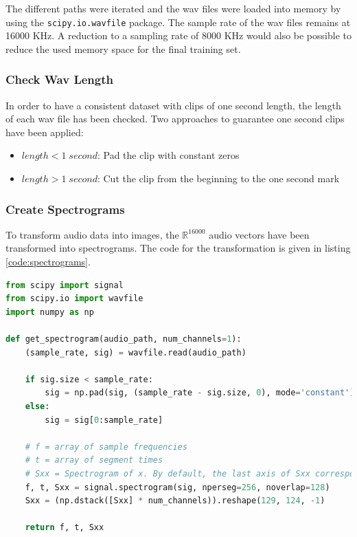 \documentclass{article}
\theoremstyle{definition}
\theoremstyle{remark}
\begin{document}
The different paths were iterated and the wav files were loaded into memory by using the \texttt{scipy.io.wavfile} package. The sample rate of the wav files remains at 16000 KHz.  A reduction to a sampling rate of 8000 KHz would also be possible to reduce the used memory space for the final training set.


\subsubsection{Check Wav Length}

In order to have a consistent dataset with clips of one second length, the length of each wav file has been checked. Two approaches to guarantee one second clips have been applied:

\begin{itemize}
	\item $length < 1 \; second$: Pad the clip with constant zeros
	\item $length > 1 \; second$: Cut the clip from the beginning to the one second mark
\end{itemize}
 

\subsubsection{Create Spectrograms}

To transform audio data into images, the $\mathbb{R}^{16000}$ audio vectors have been transformed into spectrograms. The code for the transformation is given in listing \ref{code:spectrograms}.



\begin{lstlisting}[language=Python, caption=Get spectrogram code, label=code:spectrograms]
from scipy import signal
from scipy.io import wavfile
import numpy as np

def get_spectrogram(audio_path, num_channels=1):
    (sample_rate, sig) = wavfile.read(audio_path)

    if sig.size < sample_rate:
        sig = np.pad(sig, (sample_rate - sig.size, 0), mode='constant')
    else:
        sig = sig[0:sample_rate]

    # f = array of sample frequencies
    # t = array of segment times
    # Sxx = Spectrogram of x. By default, the last axis of Sxx corresponds to the segment times.
    f, t, Sxx = signal.spectrogram(sig, nperseg=256, noverlap=128)
    Sxx = (np.dstack([Sxx] * num_channels)).reshape(129, 124, -1)

    return f, t, Sxx
\end{lstlisting}
\end{document}
